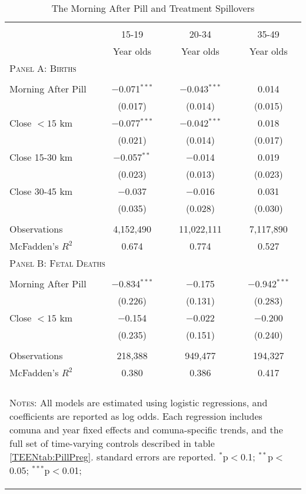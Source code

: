 \begin{table}[!htbp] \centering
\caption{The Morning After Pill and Treatment Spillovers}
\label{TEENtab:Spillover} \begin{tabular}
{@{\extracolsep{5pt}}lccc}\\[-1.8ex]\hline\hline\\
[-1.8ex] & 15-19 & 20-34 & 35-49 \\
& Year olds & Year olds & Year olds \\ \midrule
\multicolumn{4}{l}{\textsc{\noindent Panel A: Births}} \\
& & & \\
Morning After Pill &$-$0.071$^{***}$&$-$0.043$^{***}$&0.014\\
&(0.017)&(0.014)&(0.015)\\
Close $<15$ km &$-$0.077$^{***}$&$-$0.042$^{***}$&0.018\\
&(0.021)&(0.014)&(0.017)\\
Close 15-30 km &$-$0.057$^{**}$&$-$0.014&0.019\\
&(0.023)&(0.013)&(0.023)\\
Close 30-45 km &$-$0.037&$-$0.016&0.031\\
&(0.035)&(0.028)&(0.030)\\
& & & \\
Observations&4,152,490&11,022,111&7,117,890\\
McFadden's $R^2$&0.674&0.774&0.527\\ \midrule
\multicolumn{4}{l}{\textsc{\noindent Panel B: Fetal Deaths}}\\
&&&\\
Morning After Pill &$-$0.834$^{***}$&$-$0.175&$-$0.942$^{***}$\\
&(0.226)&(0.131)&(0.283)\\
Close $<15$ km &$-$0.154&$-$0.022&$-$0.200\\
&(0.235)&(0.151)&(0.240)\\
&&&\\
Observations&218,388&949,477&194,327\\
McFadden's $R^2$&0.380&0.386&0.417\\
\hline \hline \\[-1.8ex]
\multicolumn{4}{p{9.2cm}}{\begin{footnotesize}\textsc{Notes:}
All models are estimated using logistic regressions, and
coefficients are reported as log odds.  Each regression includes
comuna and year fixed effects and comuna-specific trends, and
the full set of time-varying controls described in table
\ref{TEENtab:PillPreg}.  \citet{Conley1999} standard errors are
reported.
$^{*}$p$<$0.1; $^{**}$p$<$0.05; $^{***}$p$<$0.01;\end{footnotesize}}
\normalsize\end{tabular}\end{table}
